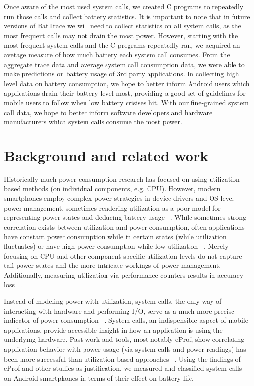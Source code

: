\documentclass[11pt]{article}
\begin{document}
Once aware of the most used system calls, we created C programs to repeatedly run those calls and
collect battery statistics.  It is important to note that in future versions of BatTrace we will need to collect
statistics on all system calls, as the most frequent calls may not drain the most power.  However, starting with the 
most frequent system calls and the C programs repeatedly ran, we acquired an avetage measure of how much battery each system call 
consumes.  From the aggregate trace data and average system call consumption data, we were 
able to make predictions on battery usage of 3rd party applications.  In collecting high level 
data on battery consumption, we hope to better inform Android users which applications drain their 
battery level most, providing a good set of guidelines for mobile users to follow when low battery 
crisises hit.  With our fine-grained system call data, we hope to better inform software developers 
and hardware manufacturers which system calls consume the most power.   

\section{Background and related work}

Historically much power consumption research has focused on using utilization-based
methods (on individual components, e.g. CPU).  However, modern smartphones employ complex 
power strategies in device drivers and OS-level power management, sometimes rendering utilization as a poor 
model for representing power states and deducing battery usage ~\cite{pathak-systemcall}.  While 
sometimes strong correlation exists between utilization and power consumption, often 
applications have constant power consumption while in certain states (while 
utilization fluctuates) or have high power consumption while low utilization ~\cite{pathak-systemcall,google-androiddev}.  
Merely focusing on CPU and other component-specific 
utilization levels do not capture tail-power states and the more intricate workings of power management.
Additionally, measuring utilization via performance counters results in accuracy 
loss ~\cite{pathak-systemcall}.  

Instead of modeling power with utilization, system calls, the only way of 
interacting with hardware and performing I/O, serve as a much more precise indicator 
of power consumption ~\cite{pathak-systemcall}.  System calls, an indispensible aspect of mobile applications, 
provide accessible insight in how an application is using the underlying hardware.  Past work and tools, most 
notably eProf, show correlating application behavior with power usage (via system calls and power readings) has 
been more successful than utilization-based approaches ~\cite{pathak-systemcall,yoon-appscope,pathak-eprof,ding-signals}.  
Using the findings of eProf and other studies as justification, we measured and classified system 
calls on Android smartphones in terms of their effect on battery life.
\end{document}
